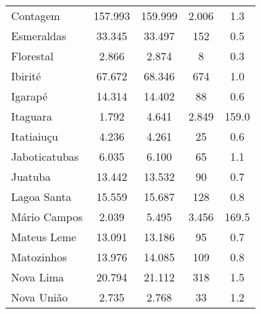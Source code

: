 \documentclass[12pt]{article}
\begin{document}
\begin{table}[htbp]
\begin{adjustbox}{max width=\linewidth}
\begin{tabular}{lcccc}
    Contagem & \textcolor[rgb]{ .2,  .2,  .2}{157.993} & \textcolor[rgb]{ .2,  .2,  .2}{159.999} & \textcolor[rgb]{ .2,  .2,  .2}{2.006} & 1.3 \\
    Esmeraldas & \textcolor[rgb]{ .2,  .2,  .2}{33.345} & \textcolor[rgb]{ .2,  .2,  .2}{33.497} & \textcolor[rgb]{ .2,  .2,  .2}{152} & 0.5 \\
    Florestal & \textcolor[rgb]{ .2,  .2,  .2}{2.866} & \textcolor[rgb]{ .2,  .2,  .2}{2.874} & \textcolor[rgb]{ .2,  .2,  .2}{8} & 0.3 \\
    Ibirité & \textcolor[rgb]{ .2,  .2,  .2}{67.672} & \textcolor[rgb]{ .2,  .2,  .2}{68.346} & \textcolor[rgb]{ .2,  .2,  .2}{674} & 1.0 \\
    Igarapé & \textcolor[rgb]{ .2,  .2,  .2}{14.314} & \textcolor[rgb]{ .2,  .2,  .2}{14.402} & \textcolor[rgb]{ .2,  .2,  .2}{88} & 0.6 \\
    Itaguara & \textcolor[rgb]{ .2,  .2,  .2}{1.792} & \textcolor[rgb]{ .2,  .2,  .2}{4.641} & \textcolor[rgb]{ .2,  .2,  .2}{2.849} & 159.0 \\
    Itatiaiuçu & \textcolor[rgb]{ .2,  .2,  .2}{4.236} & \textcolor[rgb]{ .2,  .2,  .2}{4.261} & \textcolor[rgb]{ .2,  .2,  .2}{25} & 0.6 \\
    Jaboticatubas & \textcolor[rgb]{ .2,  .2,  .2}{6.035} & \textcolor[rgb]{ .2,  .2,  .2}{6.100} & \textcolor[rgb]{ .2,  .2,  .2}{65} & 1.1 \\
    Juatuba & \textcolor[rgb]{ .2,  .2,  .2}{13.442} & \textcolor[rgb]{ .2,  .2,  .2}{13.532} & \textcolor[rgb]{ .2,  .2,  .2}{90} & 0.7 \\
    Lagoa Santa & \textcolor[rgb]{ .2,  .2,  .2}{15.559} & \textcolor[rgb]{ .2,  .2,  .2}{15.687} & \textcolor[rgb]{ .2,  .2,  .2}{128} & 0.8 \\
    Mário Campos & \textcolor[rgb]{ .2,  .2,  .2}{2.039} & \textcolor[rgb]{ .2,  .2,  .2}{5.495} & \textcolor[rgb]{ .2,  .2,  .2}{3.456} & 169.5 \\
    Mateus Leme & \textcolor[rgb]{ .2,  .2,  .2}{13.091} & \textcolor[rgb]{ .2,  .2,  .2}{13.186} & \textcolor[rgb]{ .2,  .2,  .2}{95} & 0.7 \\
    Matozinhos & \textcolor[rgb]{ .2,  .2,  .2}{13.976} & \textcolor[rgb]{ .2,  .2,  .2}{14.085} & \textcolor[rgb]{ .2,  .2,  .2}{109} & 0.8 \\
    Nova Lima & \textcolor[rgb]{ .2,  .2,  .2}{20.794} & \textcolor[rgb]{ .2,  .2,  .2}{21.112} & \textcolor[rgb]{ .2,  .2,  .2}{318} & 1.5 \\
    Nova União & \textcolor[rgb]{ .2,  .2,  .2}{2.735} & \textcolor[rgb]{ .2,  .2,  .2}{2.768} & \textcolor[rgb]{ .2,  .2,  .2}{33} & 1.2 \\

\end{tabular}
\end{adjustbox}
\end{table}
\end{document}
